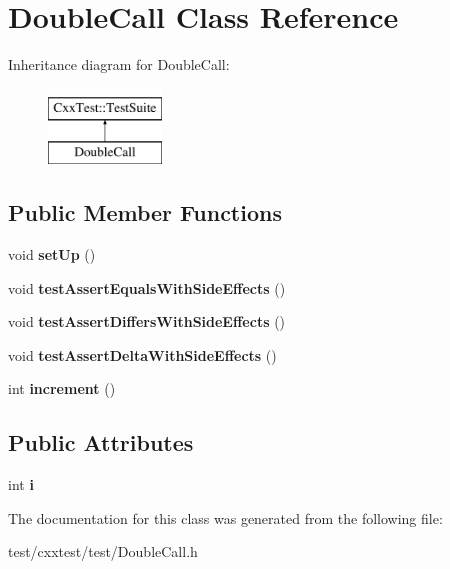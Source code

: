 \hypertarget{classDoubleCall}{\section{Double\-Call Class Reference}
\label{classDoubleCall}
}
Inheritance diagram for Double\-Call\-:\begin{figure}[H]
\begin{center}
\leavevmode
\includegraphics[height=2.000000cm]{classDoubleCall}
\end{center}
\end{figure}
\subsection*{Public Member Functions}
\begin{DoxyCompactItemize}
\item 
\hypertarget{classDoubleCall_a6bf3a9499a2d26d6779e19f8e72c6615}{void {\bfseries set\-Up} ()}\label{classDoubleCall_a6bf3a9499a2d26d6779e19f8e72c6615}

\item 
\hypertarget{classDoubleCall_a59126cc7bfbf108d1095f857a184f847}{void {\bfseries test\-Assert\-Equals\-With\-Side\-Effects} ()}\label{classDoubleCall_a59126cc7bfbf108d1095f857a184f847}

\item 
\hypertarget{classDoubleCall_a8542c7e63b1c298280f2de68880f9e3f}{void {\bfseries test\-Assert\-Differs\-With\-Side\-Effects} ()}\label{classDoubleCall_a8542c7e63b1c298280f2de68880f9e3f}

\item 
\hypertarget{classDoubleCall_a9b0f1ff26a93e7bf6aee01810e61ec17}{void {\bfseries test\-Assert\-Delta\-With\-Side\-Effects} ()}\label{classDoubleCall_a9b0f1ff26a93e7bf6aee01810e61ec17}

\item 
\hypertarget{classDoubleCall_a7090889ad0cf8435dd7426a95135bcb3}{int {\bfseries increment} ()}\label{classDoubleCall_a7090889ad0cf8435dd7426a95135bcb3}

\end{DoxyCompactItemize}
\subsection*{Public Attributes}
\begin{DoxyCompactItemize}
\item 
\hypertarget{classDoubleCall_ad258ba85647e73009f812a4f980b408c}{int {\bfseries i}}\label{classDoubleCall_ad258ba85647e73009f812a4f980b408c}

\end{DoxyCompactItemize}


The documentation for this class was generated from the following file\-:\begin{DoxyCompactItemize}
\item 
test/cxxtest/test/Double\-Call.\-h\end{DoxyCompactItemize}
